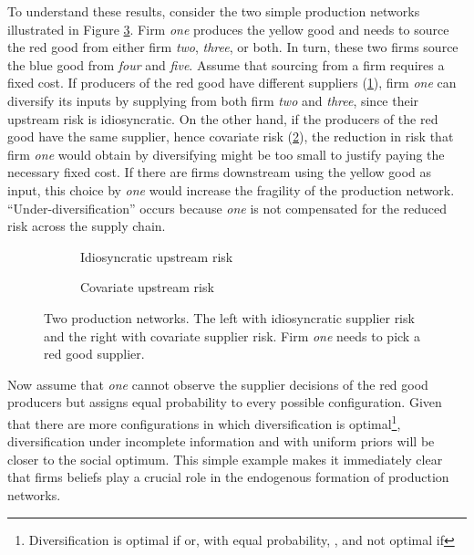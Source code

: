 \documentclass[american, abstract=on]{scrartcl}
\newcommand{\inputTikZ}[2]{%
      \scalebox{#1}{}  
    }
\begin{document}
To understand these results, consider the two simple production networks illustrated in Figure \ref{fig:example}. Firm \textit{one} produces the yellow good and needs to source the red good from either firm \textit{two}, \textit{three}, or both. In turn, these two firms source the blue good from \textit{four} and \textit{five}. Assume that sourcing from a firm requires a fixed cost. If producers of the red good have different suppliers (\ref{fig:example:idio}), firm \textit{one} can diversify its inputs by supplying from both firm \textit{two} and \textit{three}, since their upstream risk is idiosyncratic. On the other hand, if the producers of the red good have the same supplier, hence covariate risk (\ref{fig:example:cov}), the reduction in risk that firm \textit{one} would obtain by diversifying might be too small to justify paying the necessary fixed cost. If there are firms downstream using the yellow good as input, this choice by \textit{one} would increase the fragility of the production network. ``Under-diversification'' occurs because \textit{one} is not compensated for the reduced risk across the supply chain.

\begin{figure}[H]
  \centering
  \begin{subfigure}{.5\textwidth}
    \centering
    \inputTikZ{0.5}{diagrams/example-idio.tikz} 
    \caption{Idiosyncratic upstream risk}
    \label{fig:example:idio}  
  \end{subfigure}%
  \begin{subfigure}{.5\textwidth}
    \centering
    \inputTikZ{0.5}{diagrams/example-covariate.tikz} 
    \caption{Covariate upstream risk}
    \label{fig:example:cov}
  \end{subfigure}
  \caption{Two production networks. The left with idiosyncratic supplier risk and the right with covariate supplier risk. Firm \textit{one} needs to pick a red good supplier.}
  \label{fig:example}
\end{figure}

Now assume that \textit{one} cannot observe the supplier decisions of the red good producers but assigns equal probability to every possible configuration. Given that there are more configurations in which diversification is optimal\footnote{
  Diversification is optimal if \inputTikZ{0.1}{diagrams/conf-idyof.tikz} or, with equal probability, \inputTikZ{0.1}{diagrams/conf-covpref.tikz}, and not optimal if \inputTikZ{0.1}{diagrams/conf-covind.tikz}
}, diversification under incomplete information and with uniform priors will be closer to the social optimum. This simple example makes it immediately clear that firms beliefs play a crucial role in the endogenous formation of production networks. 
\end{document}
